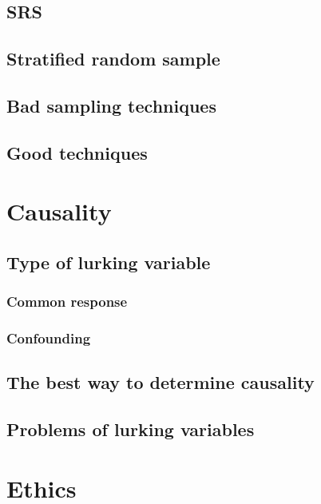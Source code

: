     \subsection{SRS}  %
    \subsection{Stratified random sample}  %
    \subsection{Bad sampling techniques}  %
    \subsection{Good techniques}  %

\section{Causality}  %
    \subsection{Type of lurking variable}  %
        \subsubsection{Common response}  %
        \subsubsection{Confounding}  %
    \subsection{The best way to determine causality}  %
    \subsection{Problems of lurking variables}  %

\section{Ethics}  %
